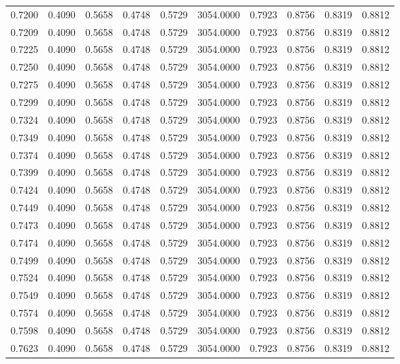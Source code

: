 \begin{tabular}{rrrrrrrrrr}
0.7200 & 0.4090 & 0.5658 & 0.4748 & 0.5729 & 3054.0000 & 0.7923 & 0.8756 & 0.8319 & 0.8812 \\
0.7209 & 0.4090 & 0.5658 & 0.4748 & 0.5729 & 3054.0000 & 0.7923 & 0.8756 & 0.8319 & 0.8812 \\
0.7225 & 0.4090 & 0.5658 & 0.4748 & 0.5729 & 3054.0000 & 0.7923 & 0.8756 & 0.8319 & 0.8812 \\
0.7250 & 0.4090 & 0.5658 & 0.4748 & 0.5729 & 3054.0000 & 0.7923 & 0.8756 & 0.8319 & 0.8812 \\
0.7275 & 0.4090 & 0.5658 & 0.4748 & 0.5729 & 3054.0000 & 0.7923 & 0.8756 & 0.8319 & 0.8812 \\
0.7299 & 0.4090 & 0.5658 & 0.4748 & 0.5729 & 3054.0000 & 0.7923 & 0.8756 & 0.8319 & 0.8812 \\
0.7324 & 0.4090 & 0.5658 & 0.4748 & 0.5729 & 3054.0000 & 0.7923 & 0.8756 & 0.8319 & 0.8812 \\
0.7349 & 0.4090 & 0.5658 & 0.4748 & 0.5729 & 3054.0000 & 0.7923 & 0.8756 & 0.8319 & 0.8812 \\
0.7374 & 0.4090 & 0.5658 & 0.4748 & 0.5729 & 3054.0000 & 0.7923 & 0.8756 & 0.8319 & 0.8812 \\
0.7399 & 0.4090 & 0.5658 & 0.4748 & 0.5729 & 3054.0000 & 0.7923 & 0.8756 & 0.8319 & 0.8812 \\
0.7424 & 0.4090 & 0.5658 & 0.4748 & 0.5729 & 3054.0000 & 0.7923 & 0.8756 & 0.8319 & 0.8812 \\
0.7449 & 0.4090 & 0.5658 & 0.4748 & 0.5729 & 3054.0000 & 0.7923 & 0.8756 & 0.8319 & 0.8812 \\
0.7473 & 0.4090 & 0.5658 & 0.4748 & 0.5729 & 3054.0000 & 0.7923 & 0.8756 & 0.8319 & 0.8812 \\
0.7474 & 0.4090 & 0.5658 & 0.4748 & 0.5729 & 3054.0000 & 0.7923 & 0.8756 & 0.8319 & 0.8812 \\
0.7499 & 0.4090 & 0.5658 & 0.4748 & 0.5729 & 3054.0000 & 0.7923 & 0.8756 & 0.8319 & 0.8812 \\
0.7524 & 0.4090 & 0.5658 & 0.4748 & 0.5729 & 3054.0000 & 0.7923 & 0.8756 & 0.8319 & 0.8812 \\
0.7549 & 0.4090 & 0.5658 & 0.4748 & 0.5729 & 3054.0000 & 0.7923 & 0.8756 & 0.8319 & 0.8812 \\
0.7574 & 0.4090 & 0.5658 & 0.4748 & 0.5729 & 3054.0000 & 0.7923 & 0.8756 & 0.8319 & 0.8812 \\
0.7598 & 0.4090 & 0.5658 & 0.4748 & 0.5729 & 3054.0000 & 0.7923 & 0.8756 & 0.8319 & 0.8812 \\
0.7623 & 0.4090 & 0.5658 & 0.4748 & 0.5729 & 3054.0000 & 0.7923 & 0.8756 & 0.8319 & 0.8812 \\

\end{tabular}
